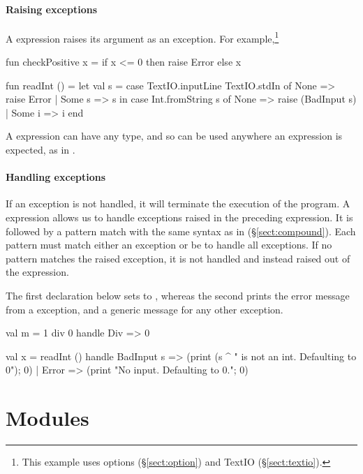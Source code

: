 \documentclass[12pt,a4paper]{book}
\begin{document}
\paragraph{Raising exceptions}
A  expression raises its argument as an exception. For example,\footnote{This example uses options (\S\ref{sect:option}) and TextIO (\S\ref{sect:textio}).}
\begin{smlcode}
fun checkPositive x =
  if x <= 0 then raise Error
  else x
\end{smlcode}

\begin{smlcode}
fun readInt () =
  let val s =
    case TextIO.inputLine TextIO.stdIn of
      None => raise Error
    | Some s => s
  in
    case Int.fromString s of
      None => raise (BadInput s)
    | Some i => i
  end
\end{smlcode}

A  expression can have any type, and so can be used anywhere
an expression is expected, as in .

\paragraph{Handling exceptions} If an exception is not handled, it will
terminate the execution of the program.  A  expression allows
us to handle exceptions raised in the preceding expression. It is followed by a
pattern match with the same syntax as in 
(\S\ref{sect:compound}). Each pattern must match either an exception or be
\smlinline{_} to handle all exceptions. If no pattern matches the raised
exception, it is not handled and instead raised out of the 
expression.

The first declaration below sets  to , whereas the second prints
the error message from a  exception, and a generic
message for any other exception.
\begin{smlcode}
val m =
  1 div 0 handle Div => 0

val x =
  readInt ()
  handle
    BadInput s => (print (s ^ " is not an int. Defaulting to 0"); 0)
  | Error => (print "No input. Defaulting to 0."; 0)

\end{smlcode}

\section{Modules}
\label{sect:modules}
\end{document}
